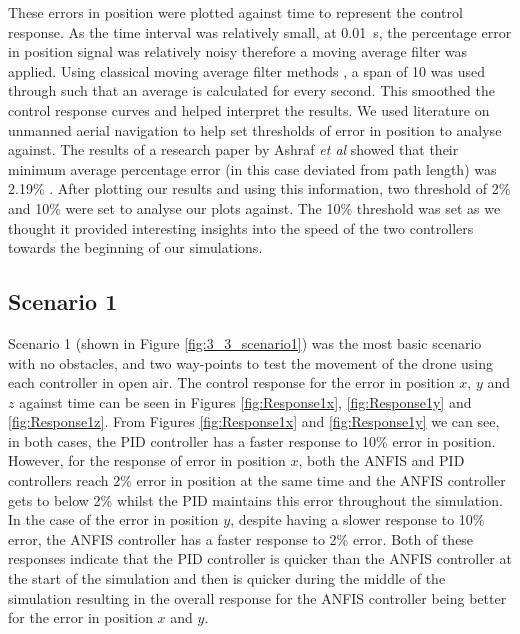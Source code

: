 These errors in position were plotted against time to represent the control response. As the time interval was relatively small, at \SI{0.01}{\second}, the percentage error in position signal was relatively noisy therefore a moving average filter was applied. Using classical moving average filter methods \cite{zain2}, a span of 10 was used through such that an average is calculated for every second. This smoothed the control response curves and helped interpret the results. We used literature on unmanned aerial navigation to help set thresholds of error in position to analyse against. The results of a research paper by Ashraf \textit{et al} showed that their minimum average percentage error (in this case deviated from path length) was 2.19\% \cite{zain8}. After plotting our results and using this information, two threshold of 2\% and 10\% were set to analyse our plots against. The 10\% threshold was set as we thought it provided interesting insights into the speed of the two controllers towards the beginning of our simulations. 

\subsection{Scenario 1}

Scenario 1 (shown in Figure \ref{fig:3_3_scenario1}) was the most basic scenario with no obstacles, and two way-points to test the movement of the drone using each controller in open air. The control response for the error in position $x$, $y$ and $z$ against time can be seen in Figures \ref{fig:Response1x}, \ref{fig:Response1y} and \ref{fig:Response1z}. From Figures \ref{fig:Response1x} and \ref{fig:Response1y} we can see, in both cases, the PID controller has a faster response to 10\% error in position. However, for the response of error in position $x$, both the ANFIS and PID controllers reach 2\% error in position at the same time and the ANFIS controller gets to below 2\% whilst the PID maintains this error throughout the simulation. In the case of the error in position $y$, despite having a slower response to 10\% error, the ANFIS controller has a faster response to 2\% error. Both of these responses indicate that the PID controller is quicker than the ANFIS controller at the start of the simulation and then is quicker during the middle of the simulation resulting in the overall response for the ANFIS controller being better for the error in position $x$ and $y$. 

